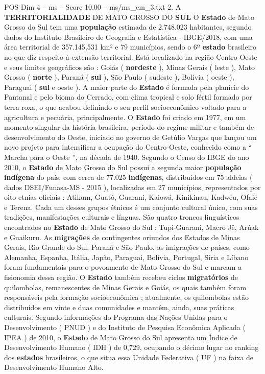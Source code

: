 \begin{textsample}{POS Dim 4 – ms – Score 10.00 – ms/ms\_em\_3.txt}  \label{ex:f4_pos_154}
2.
A \textbf{TERRITORIALIDADE} DE MATO GROSSO DO \textbf{SUL} O \textbf{Estado} de Mato Grosso do Sul tem uma \textbf{população} estimada de 2.748.023 habitantes, segundo dados do Instituto Brasileiro de Geografia e Estatística - IBGE/2018, com uma área territorial de 357.145,531 km² e 79 municípios, sendo o 6º \textbf{estado} brasileiro no que diz respeito à extensão territorial.
Está localizado na região Centro-Oeste e seus limites geográficos são : Goiás ( \textbf{nordeste} ), Minas Gerais ( leste ), Mato Grosso ( \textbf{norte} ), Paraná ( \textbf{sul} ), São Paulo ( sudeste ), Bolívia ( oeste ), Paraguai ( \textbf{sul} e oeste ).
A maior parte do \textbf{Estado} é formada pela planície do Pantanal e pelo bioma do Cerrado, com clima tropical e solo fértil formado por terra roxa, o que acabou definindo o seu perfil socioeconômico voltado para a agricultura e pecuária, principalmente.
O \textbf{Estado} foi criado em 1977, em um momento singular da história brasileira, período do regime militar e também de desenvolvimento do Oeste, iniciado no governo de Getúlio Vargas que lançou um novo projeto para intensificar a ocupação do Centro-Oeste, conhecido como a “ Marcha para o Oeste ”, na década de 1940.
Segundo o Censo do IBGE do ano 2010, o \textbf{Estado} de Mato Grosso do Sul possui a segunda maior \textbf{população} \textbf{indígena} do país, com cerca de 77.025 \textbf{indígenas}, distribuídos em 75 aldeias ( dados DSEI/Funasa-MS - 2015 ), localizadas em 27 municípios, representados por oito etnias oficiais : Atikum, Guató, Guarani, Kaiowá, Kinikinau, Kadwéu, Ofaié e Terena.
Cada um desses grupos étnicos é um conjunto cultural único, com suas tradições, manifestações culturais e línguas.
São quatro troncos linguísticos encontrados no \textbf{Estado} de Mato Grosso do Sul : Tupi-Guarani, Macro Jê, Arúak e Guaikuru.
As \textbf{migrações} de contingentes oriundos dos Estados de Minas Gerais, Rio Grande do Sul, Paraná e São Paulo, as imigrações de países, como Alemanha, Espanha, Itália, Japão, Paraguai, Bolívia, Portugal, Síria e Líbano foram fundamentais para o povoamento de Mato Grosso do Sul e marcam a fisionomia dessa região.
O \textbf{Estado} também recebeu ciclos \textbf{migratórios} de quilombolas, remanescentes de Minas Gerais e Goiás, os quais também foram responsáveis pela formação socioeconômica ; atualmente, os quilombolas estão distribuídos em vinte e duas comunidades e mantêm, ainda, suas práticas culturais.
Segundo informações do Programa das Nações Unidas para o Desenvolvimento ( PNUD ) e do Instituto de Pesquisa Econômica Aplicada ( IPEA ) de 2010, o \textbf{Estado} de Mato Grosso do Sul apresenta um Índice de Desenvolvimento Humano ( IDH ) de 0,729, ocupando o décimo lugar no ranking dos \textbf{estados} brasileiros, o que situa essa Unidade Federativa ( UF ) na faixa de Desenvolvimento Humano Alto.

\end{textsample}
